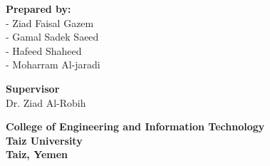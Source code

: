 \begin{titlepage}
\begin{center}
        \textbf{\normalsize Prepared by:} \\[0.3cm]
        \normalsize - Ziad Faisal Gazem \\[0.1cm]
        \normalsize - Gamal Sadek Saeed \\[0.1cm]
        \normalsize - Hafeed Shaheed \\[0.1cm]
        \normalsize - Moharram Al-jaradi \\[0.1cm]
        
        \vspace{0.6cm}
        
        \textbf{\normalsize Supervisor} \\[0.3cm]
        \normalsize Dr. Ziad Al-Robih
        
        \vfill
        
        \textbf{\normalsize College of Engineering and Information Technology} \\[0.2cm]
        \textbf{\normalsize Taiz University} \\[0.2cm]
        \textbf{\normalsize Taiz, Yemen} \\[0.2cm]
        \textbf{\normalsize }
    \end{center}

\end{titlepage}
